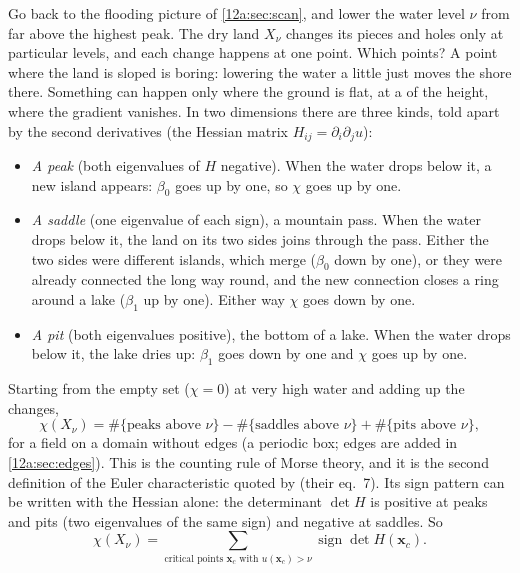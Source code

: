 Go back to the flooding picture of \cref{12a:sec:scan}, and lower the water level $\nu$ from far above the
highest peak. The dry land $X_\nu$ changes its pieces and holes only at particular levels, and each change
happens at one point. Which points? A point where the land is sloped is boring: lowering the water a little
just moves the shore there. Something can happen only where the ground is flat, at a 
of the height, where the gradient vanishes. In two dimensions there are three kinds, told apart by the
second derivatives (the Hessian matrix $H_{ij}=\partial_i\partial_ju$):
\begin{itemize}[itemsep=1pt,leftmargin=1.2em]
  \item \emph{A peak} (both eigenvalues of $H$ negative). When the water drops below it, a new island appears:
        $\beta_0$ goes up by one, so $\chi$ goes up by one.
  \item \emph{A saddle} (one eigenvalue of each sign), a mountain pass. When the water drops below it, the
        land on its two sides joins through the pass. Either the two sides were different islands, which merge
        ($\beta_0$ down by one), or they were already connected the long way round, and the new connection
        closes a ring around a lake ($\beta_1$ up by one). Either way $\chi$ goes down by one.
  \item \emph{A pit} (both eigenvalues positive), the bottom of a lake. When the water drops below it, the lake
        dries up: $\beta_1$ goes down by one and $\chi$ goes up by one.
\end{itemize}
Starting from the empty set ($\chi=0$) at very high water and adding up the changes,
\begin{equation}
  \chi(X_\nu)=\#\{\text{peaks above }\nu\}-\#\{\text{saddles above }\nu\}+\#\{\text{pits above }\nu\},
  \label{12a:eq:morse}
\end{equation}
for a field on a domain without edges (a periodic box; edges are added in \cref{12a:sec:edges}). This is the
counting rule of Morse theory, and it is the second definition of the Euler characteristic quoted by
\cite{HamiltonGottWeinberg1986} (their eq.~7). Its sign pattern can be written with the Hessian alone: the
determinant $\det H$ is positive at peaks and pits (two eigenvalues of the same sign) and negative at
saddles. So
\begin{equation}
  \chi(X_\nu)=\sum_{\text{critical points }\bm x_c\text{ with }u(\bm x_c)>\nu}\operatorname{sign}\det H(\bm x_c).
  \label{12a:eq:morse-sign}
\end{equation}

